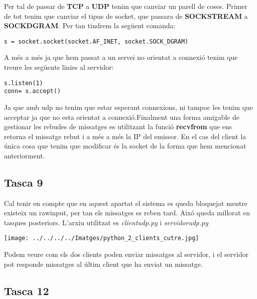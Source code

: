 \documentclass[11p]{article}
\begin{document}
Per tal de passar de \textbf{TCP} a \textbf{UDP} tenim que canviar un parell de coses. Primer de tot tenim que canviar el tipus de socket, que passara de \textbf{SOCK\textunderscore STREAM} a \textbf{SOCK\textunderscore DGRAM}. Per tan tindrem la següent comanda:
\newline
\begin{lstlisting}
s = socket.socket(socket.AF_INET, socket.SOCK_DGRAM)
\end{lstlisting}

A més a més ja que hem passat a un servei no orientat a connexió tenim que treure les següents linies al servidor:
\begin{lstlisting}
s.listen(1)
conn= s.accept()
\end{lstlisting}
Ja que amb udp no tenim que estar esperant connexions, ni tampoc les tenim que acceptar ja que no esta orientat a connexió.Finalment una forma amigable de gestionar les rebudes de missatges es utilitzant la funció \textbf{recvfrom} que ens retorna el missatge rebut i a més a més la IP del emissor.
\newline
En el cas del client la única cosa que tenim que modificar és la socket de la forma que hem mencionat anteriorment.

\subsection{Tasca 9}

Cal tenir en compte que en aquest apartat el sistema es queda bloquejat mentre existeix un raw\textunderscore input, per tan els missatges es reben tard. Aixó queda millorat en tasques posteriors. L'arxiu utilitzat es \textit{client\textunderscore udp.py} i \textit{servidor\textunderscore udp.py}
\centerline{\texttt{[image: ../../../../Imatges/python\_2\_clients\_cutre.jpg]}}
\newline
Podem veure com els dos clients poden enviar missatges al servidor, i el servidor pot responde missatges al últim client que ha enviat un missatge.

\subsection{Tasca 12}
\end{document}
